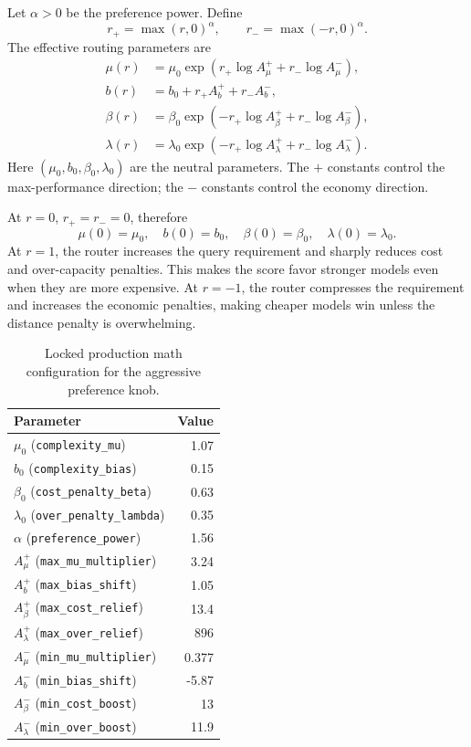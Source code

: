 Let \(\alpha>0\) be the preference power. Define
\[
  r_+ = \max(r,0)^\alpha,
  \qquad
  r_- = \max(-r,0)^\alpha.
\]
The effective routing parameters are
\begin{align}
  \mu(r)
  &=
  \mu_0
  \exp\left(
    r_+\log A_{\mu}^{+}
    + r_-\log A_{\mu}^{-}
  \right),\\
  b(r)
  &=
  b_0 + r_+ A_b^{+} + r_- A_b^{-},\\
  \beta(r)
  &=
  \beta_0
  \exp\left(
    -r_+\log A_{\beta}^{+}
    + r_-\log A_{\beta}^{-}
  \right),\\
  \lambda(r)
  &=
  \lambda_0
  \exp\left(
    -r_+\log A_{\lambda}^{+}
    + r_-\log A_{\lambda}^{-}
  \right).
\end{align}
Here \((\mu_0,b_0,\beta_0,\lambda_0)\) are the neutral parameters.
The \(+\) constants control the max-performance direction; the \(-\)
constants control the economy direction.

At \(r=0\), \(r_+=r_-=0\), therefore
\[
  \mu(0)=\mu_0,\quad b(0)=b_0,\quad
  \beta(0)=\beta_0,\quad \lambda(0)=\lambda_0.
\]
At \(r=1\), the router increases the query requirement and sharply reduces
cost and over-capacity penalties. This makes the score favor stronger models
even when they are more expensive. At \(r=-1\), the router compresses the
requirement and increases the economic penalties, making cheaper models win
unless the distance penalty is overwhelming.

\begin{table}[ht]
\centering
\caption{Locked production math configuration for the aggressive preference
knob.}
\label{tab:brick-knob-defaults}
\small
\begin{tabular}{l r}
\toprule
\textbf{Parameter} & \textbf{Value} \\
\midrule
\(\mu_0\) (\texttt{complexity\_mu}) & 1.07 \\
\(b_0\) (\texttt{complexity\_bias}) & 0.15 \\
\(\beta_0\) (\texttt{cost\_penalty\_beta}) & 0.63 \\
\(\lambda_0\) (\texttt{over\_penalty\_lambda}) & 0.35 \\
\(\alpha\) (\texttt{preference\_power}) & 1.56 \\
\(A_{\mu}^{+}\) (\texttt{max\_mu\_multiplier}) & 3.24 \\
\(A_b^{+}\) (\texttt{max\_bias\_shift}) & 1.05 \\
\(A_{\beta}^{+}\) (\texttt{max\_cost\_relief}) & 13.4 \\
\(A_{\lambda}^{+}\) (\texttt{max\_over\_relief}) & 896 \\
\(A_{\mu}^{-}\) (\texttt{min\_mu\_multiplier}) & 0.377 \\
\(A_b^{-}\) (\texttt{min\_bias\_shift}) & -5.87 \\
\(A_{\beta}^{-}\) (\texttt{min\_cost\_boost}) & 13 \\
\(A_{\lambda}^{-}\) (\texttt{min\_over\_boost}) & 11.9 \\
\bottomrule
\end{tabular}
\end{table}

